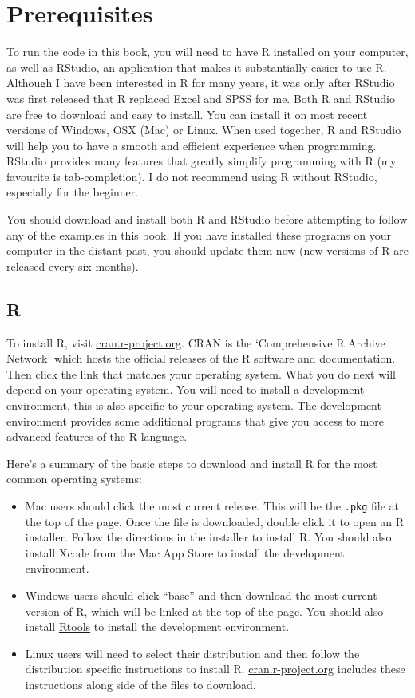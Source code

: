 \documentclass[]{book}
\begin{document}
\section{Prerequisites}\label{prerequisites}

To run the code in this book, you will need to have R installed on your
computer, as well as RStudio, an application that makes it substantially
easier to use R. Although I have been interested in R for many years, it
was only after RStudio was first released that R replaced Excel and SPSS
for me. Both R and RStudio are free to download and easy to install. You
can install it on most recent versions of Windows, OSX (Mac) or Linux.
When used together, R and RStudio will help you to have a smooth and
efficient experience when programming. RStudio provides many features
that greatly simplify programming with R (my favourite is
tab-completion). I do not recommend using R without RStudio, especially
for the beginner.

You should download and install both R and RStudio before attempting to
follow any of the examples in this book. If you have installed these
programs on your computer in the distant past, you should update them
now (new versions of R are released every six months).

\subsection{R}\label{r}

To install R, visit
\href{http://cran.r-project.org}{cran.r-project.org}. CRAN is the
`Comprehensive R Archive Network' which hosts the official releases of
the R software and documentation. Then click the link that matches your
operating system. What you do next will depend on your operating system.
You will need to install a development environment, this is also
specific to your operating system. The development environment provides
some additional programs that give you access to more advanced features
of the R language.

Here's a summary of the basic steps to download and install R for the
most common operating systems:

\begin{itemize}
\item
  Mac users should click the most current release. This will be the
  \texttt{.pkg} file at the top of the page. Once the file is
  downloaded, double click it to open an R installer. Follow the
  directions in the installer to install R. You should also install
  Xcode from the Mac App Store to install the development environment.
\item
  Windows users should click ``base'' and then download the most current
  version of R, which will be linked at the top of the page. You should
  also install
  \href{http://cran.r-project.org/bin/windows/Rtools/}{Rtools} to
  install the development environment.
\item
  Linux users will need to select their distribution and then follow the
  distribution specific instructions to install R.
  \href{https://cran.r-project.org/bin/linux/}{cran.r-project.org}
  includes these instructions along side of the files to download.
\end{itemize}
\end{document}
